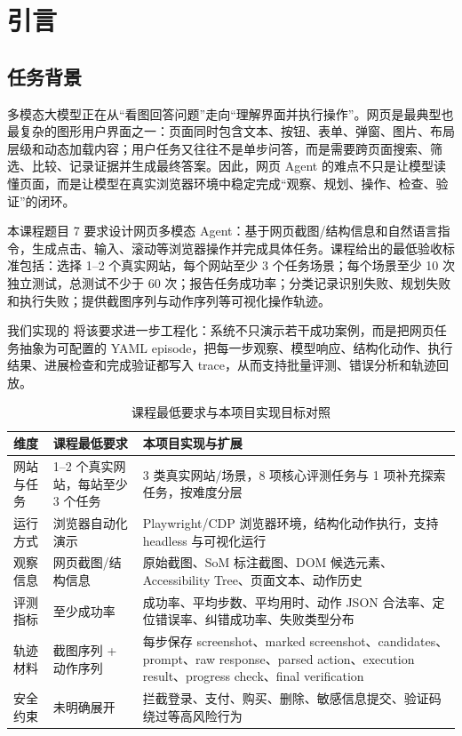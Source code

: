 
\section{引言}

\subsection{任务背景}

多模态大模型正在从“看图回答问题”走向“理解界面并执行操作”。网页是最典型也最复杂的图形用户界面之一：页面同时包含文本、按钮、表单、弹窗、图片、布局层级和动态加载内容；用户任务又往往不是单步问答，而是需要跨页面搜索、筛选、比较、记录证据并生成最终答案。因此，网页 Agent 的难点不只是让模型读懂页面，而是让模型在真实浏览器环境中稳定完成“观察、规划、操作、检查、验证”的闭环。

本课程题目 7 要求设计网页多模态 Agent：基于网页截图/结构信息和自然语言指令，生成点击、输入、滚动等浏览器操作并完成具体任务。课程给出的最低验收标准包括：选择 1--2 个真实网站，每个网站至少 3 个任务场景；每个场景至少 10 次独立测试，总测试不少于 60 次；报告任务成功率；分类记录识别失败、规划失败和执行失败；提供截图序列与动作序列等可视化操作轨迹。

我们实现的 \projectname{} 将该要求进一步工程化：系统不只演示若干成功案例，而是把网页任务抽象为可配置的 YAML episode，把每一步观察、模型响应、结构化动作、执行结果、进展检查和完成验证都写入 trace，从而支持批量评测、错误分析和轨迹回放。

\begin{table}[H]
  \centering
  \caption{课程最低要求与本项目实现目标对照}
  \label{tab:course-requirement}
  \small
  \begin{tabularx}{\textwidth}{p{}YY}
    \toprule
    维度 & 课程最低要求 & 本项目实现与扩展 \\
    \midrule
    网站与任务 & 1--2 个真实网站，每站至少 3 个任务 & 3 类真实网站/场景，8 项核心评测任务与 1 项补充探索任务，按难度分层 \\
    运行方式 & 浏览器自动化演示 & Playwright/CDP 浏览器环境，结构化动作执行，支持 headless 与可视化运行 \\
    观察信息 & 网页截图/结构信息 & 原始截图、SoM 标注截图、DOM 候选元素、Accessibility Tree、页面文本、动作历史 \\
    评测指标 & 至少成功率 & 成功率、平均步数、平均用时、动作 JSON 合法率、定位错误率、纠错成功率、失败类型分布 \\
    轨迹材料 & 截图序列 + 动作序列 & 每步保存 screenshot、marked screenshot、candidates、prompt、raw response、parsed action、execution result、progress check、final verification \\
    安全约束 & 未明确展开 & 拦截登录、支付、购买、删除、敏感信息提交、验证码绕过等高风险行为 \\
    \bottomrule
  \end{tabularx}
\end{table}


